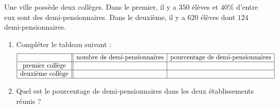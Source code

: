 
\begin{exercice}\label{exo2smath-0157}

Une ville possède deux collèges. Dans le premier, il y a $350$ élèves et $40\%$ d'entre eux sont des demi-pensionnaires.  Dans le deuxième, il y a $620$ élèves dont $124$ demi-pensionnaires.  
\begin{enumerate}
    \item
        Compléter le tableau suivant :
        \begin{equation*}
            \begin{array}[]{|c||c|c|}
                \hline
                &\text{nombre de demi-pensionnaires}&\text{pourcentage de demi-pensionnaires}\\
                \hline
                \text{premier collège}&&\\
                \hline
                \text{deuxième collège}&&\\
                \hline
            \end{array}
        \end{equation*}
\item
Quel est le pourcentage de demi-pensionnaires dans les deux établissements réunis ?
\end{enumerate}

\end{exercice}
